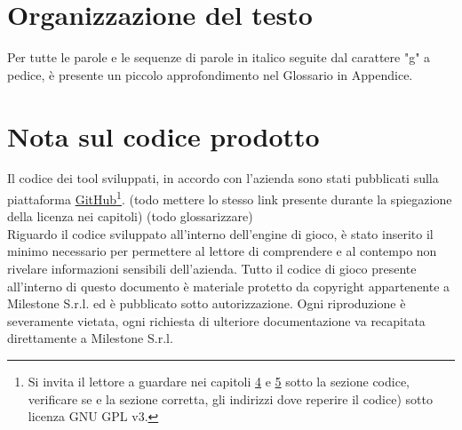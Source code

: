 \section{Organizzazione del testo}

Per tutte le parole e le sequenze di parole in italico seguite dal carattere "g" a pedice, è presente un piccolo approfondimento nel Glossario in Appendice.

\section{Nota sul codice prodotto}

Il codice dei tool sviluppati, in accordo con l'azienda sono stati pubblicati sulla piattaforma \hyperref{https://github.com/}{}{}{GitHub}\footnote{Si invita il lettore a guardare nei capitoli \hyperref[cap:multiplatform-file-analyzer]{4} e \hyperref[cap:xml-editor]{5} sotto la sezione codice, verificare se e la sezione corretta, gli indirizzi dove reperire il codice) sotto licenza GNU GPL v3.}.
(todo mettere lo stesso link presente durante la spiegazione della licenza nei capitoli) (todo glossarizzare)\\

Riguardo il codice sviluppato all'interno dell'engine di gioco, è stato inserito il minimo necessario per permettere al lettore di comprendere e al contempo non rivelare informazioni sensibili dell'azienda. Tutto il codice di gioco presente all'interno di questo documento è materiale protetto da copyright appartenente a Milestone S.r.l. ed è pubblicato sotto autorizzazione. Ogni riproduzione è severamente vietata, ogni richiesta di ulteriore documentazione va recapitata direttamente a Milestone S.r.l.